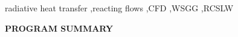 \documentclass[preprint,12pt]{elsarticle}
\begin{document}
\begin{frontmatter}




        \begin{keyword}
            radiative heat transfer \sep reacting flows  \sep CFD \sep WSGG \sep RCSLW
        \end{keyword}

    \end{frontmatter}

    \linenumbers


    {\bf PROGRAM SUMMARY}
\end{document}
